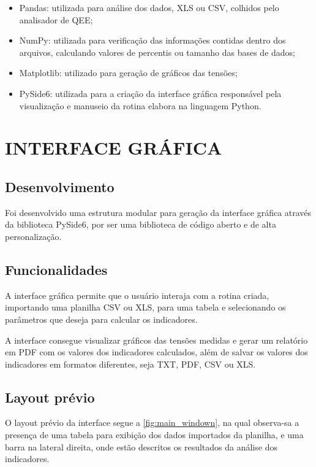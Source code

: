 \begin{itemize}
  \item Pandas: utilizada para análise dos dados, XLS ou CSV, colhidos pelo analisador de QEE;
  \item NumPy: utilizada para verificação das informações contidas dentro dos arquivos, calculando valores de percentis ou tamanho das bases de dados;
  \item Matplotlib: utilizado para geração de gráficos das tensões;
  \item PySide6: utilizada para a criação da interface gráfica responsável pela visualização e manuseio da rotina elabora na linguagem Python.
\end{itemize}

\section{INTERFACE GRÁFICA}

\subsection{Desenvolvimento}

Foi desenvolvido uma estrutura modular para geração da interface gráfica através da biblioteca PySide6, por ser uma biblioteca de código aberto e de alta personalização.

\subsection{Funcionalidades}

A interface gráfica permite que o usuário interaja com a rotina criada, importando uma planilha CSV ou XLS, para uma tabela e selecionando os parâmetros que deseja para calcular os indicadores.

A interface consegue visualizar gráficos das tensões medidas e gerar um relatório em PDF com os valores dos indicadores calculados, além de salvar os valores dos indicadores em formatos diferentes, seja TXT, PDF, CSV ou XLS.

\subsection{Layout prévio}

O layout prévio da interface segue a \autoref{fig:main_windown}, na qual observa-sa a presença de uma tabela para exibição dos dados importados da planilha, e uma barra na lateral direita, onde estão descritos os resultados da análise dos indicadores.

